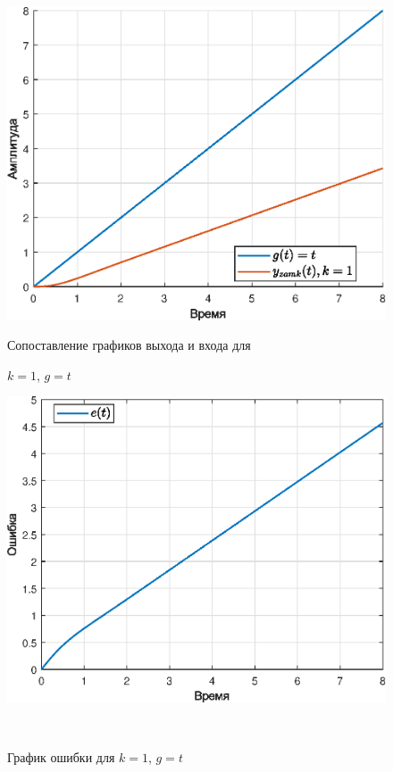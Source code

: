 \documentclass[a4paper]{article}
\begin{document}
\begin{figure}[H]
    \begin{minipage}{0.5\textwidth}
        \centering \includegraphics[width=\textwidth]{ex3/k1_g_vt.eps}
        \caption{Сопоставление графиков выхода и входа для}
        \centerline{$k=1$, $g=t$}
    \end{minipage}\hfill
    \begin{minipage}{0.5\textwidth}
        \centering \includegraphics[width=\textwidth]{ex3/k1_g_vt_error.eps}
        \caption{График ошибки для $k=1$, $g=t$}
    \end{minipage}\\[1em]
\end{figure}\noindent\
\end{document}
